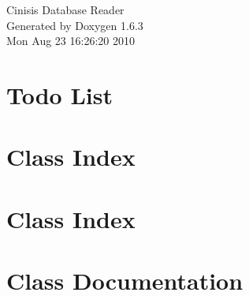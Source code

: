 \documentclass[a4paper]{book}
\begin{document}
\hypersetup{pageanchor=false}
\begin{titlepage}
\vspace*{7cm}
\begin{center}
{\Large Cinisis Database Reader }\\
\vspace*{1cm}
{\large Generated by Doxygen 1.6.3}\\
\vspace*{0.5cm}
{\small Mon Aug 23 16:26:20 2010}\\
\end{center}
\end{titlepage}
\clearemptydoublepage
{}
\tableofcontents
\clearemptydoublepage
{}
\hypersetup{pageanchor=true}
\chapter{Todo List}
\label{todo}
\hypertarget{todo}{}

\chapter{Class Index}

\chapter{Class Index}

\chapter{Class Documentation}





















\printindex
\end{document}
